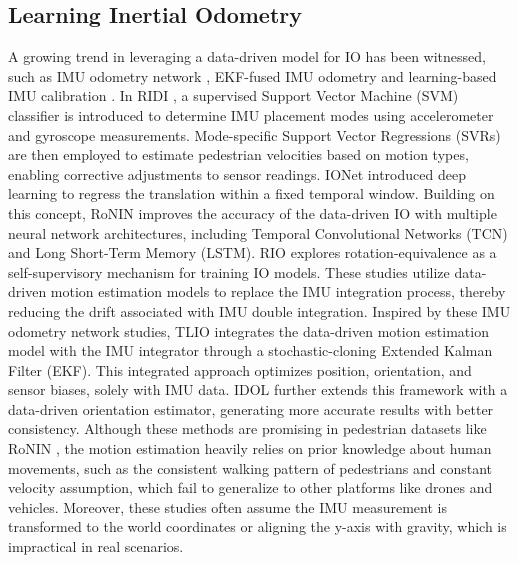 \subsection{Learning Inertial Odometry}
\label{Sec: LIO}
A growing trend in leveraging a data-driven model for IO has been witnessed, such as IMU odometry network \cite{yan2018ridi, chen2018ionet}, EKF-fused IMU odometry \cite{liu2020tlio, sun2021idol, cao2022rio} and learning-based IMU calibration \cite{brossard2020denoising}.
In RIDI \cite{yan2018ridi}, a supervised Support Vector Machine (SVM) classifier is introduced to determine IMU placement modes using accelerometer and gyroscope measurements.
Mode-specific Support Vector Regressions (SVRs) are then employed to estimate pedestrian velocities based on motion types, enabling corrective adjustments to sensor readings.
IONet \cite{chen2018ionet} introduced deep learning to regress the translation within a fixed temporal window. 
Building on this concept, RoNIN \cite{herath2020ronin} improves the accuracy of the data-driven IO with multiple neural network architectures, including Temporal Convolutional Networks (TCN) and Long Short-Term Memory (LSTM).
RIO \cite{cao2022rio} explores rotation-equivalence as a self-supervisory mechanism for training IO models. 
These studies utilize data-driven motion estimation models to replace the IMU integration process, thereby reducing the drift associated with IMU double integration. 
Inspired by these IMU odometry network studies, TLIO \cite{liu2020tlio} integrates the data-driven motion estimation model with the IMU integrator through a stochastic-cloning Extended Kalman Filter (EKF). 
This integrated approach optimizes position, orientation, and sensor biases, solely with IMU data.
IDOL \cite{sun2021idol} further extends this framework with a data-driven orientation estimator, generating more accurate results with better consistency.
Although these methods are promising in pedestrian datasets like RoNIN \cite{herath2020ronin}, the motion estimation heavily relies on prior knowledge about human movements, such as the consistent walking pattern of pedestrians and constant velocity assumption, which fail to generalize to other platforms like drones and vehicles.
Moreover, these studies often assume the IMU measurement is transformed to the world coordinates or aligning the y-axis with gravity, which is impractical in real scenarios. 

